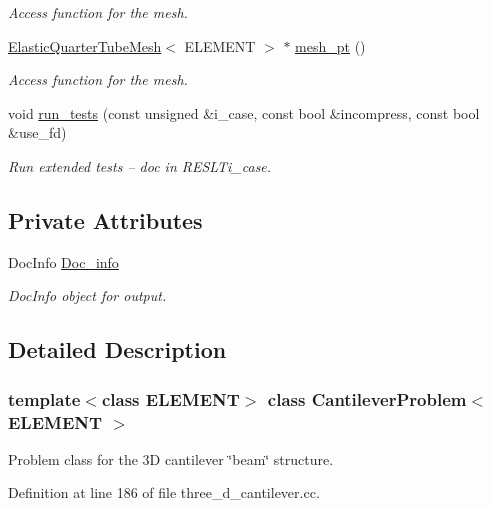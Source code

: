 \begin{DoxyCompactItemize}
\begin{DoxyCompactList}\small\item\em Access function for the mesh. \end{DoxyCompactList}\item 
\hyperlink{classElasticQuarterTubeMesh}{Elastic\+Quarter\+Tube\+Mesh}$<$ E\+L\+E\+M\+E\+NT $>$ $\ast$ \hyperlink{classCantileverProblem_a3dd4b577c391a901e1568af225324282}{mesh\+\_\+pt} ()
\begin{DoxyCompactList}\small\item\em Access function for the mesh. \end{DoxyCompactList}\item 
void \hyperlink{classCantileverProblem_aff6fdf1e52813bf62e2b4514dbda7f00}{run\+\_\+tests} (const unsigned \&i\+\_\+case, const bool \&incompress, const bool \&use\+\_\+fd)
\begin{DoxyCompactList}\small\item\em Run extended tests -- doc in R\+E\+S\+L\+Ti\+\_\+case. \end{DoxyCompactList}\end{DoxyCompactItemize}
\subsection*{Private Attributes}
\begin{DoxyCompactItemize}
\item 
Doc\+Info \hyperlink{classCantileverProblem_a2d230bb59f229cf02a06a50493dd48e4}{Doc\+\_\+info}
\begin{DoxyCompactList}\small\item\em Doc\+Info object for output. \end{DoxyCompactList}\end{DoxyCompactItemize}


\subsection{Detailed Description}
\subsubsection*{template$<$class E\+L\+E\+M\+E\+NT$>$\newline
class Cantilever\+Problem$<$ E\+L\+E\+M\+E\+N\+T $>$}

Problem class for the 3D cantilever \char`\"{}beam\char`\"{} structure. 

Definition at line 186 of file three\+\_\+d\+\_\+cantilever.\+cc.




